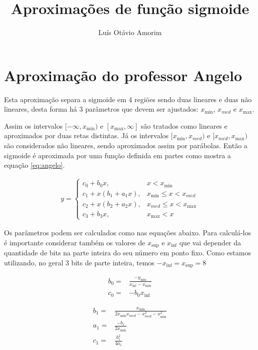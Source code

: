 \documentclass{article}
\author{Luís Otávio Amorim}
\title{Aproximações de função sigmoide}
\begin{document}
\maketitle
\section{Aproximação do professor Angelo}
Esta aproximação separa a sigmoide em 4 regiões sendo duas lineares e duas não lineares, desta forma há 3 parâmetros que devem ser ajustados: $x_{\min}$, $x_{med}$ e $x_{\max}$.

Assim os intervalos $[-\infty, x_{\min})$ e $[x_{\max}, \infty]$ são tratados como lineares e aproximados por duas retas distintas. Já os intervalos $[x_{\min}, x_{med})$ e $[x_{med}, x_{\max})$ são considerados não lineares, sendo aproximados assim por parábolas. Então a sigmoide é aproximada por uma função definida em partes como mostra a equação \ref{eq:angelo}.

\begin{equation}
    \label{eq:angelo}
    \begin{split}
    y =
    \begin{cases}
        c_0 + b_0  x, &x < x_{\min} \\
        c_1 + x  (b_1 + a_1  x), &x_{\min} \leq x < x_{med} \\
        c_2 + x  (b_2 + a_2  x), &x_{med} \leq x < x_{\max} \\
        c_3 + b_3  x,  &x_{\max} < x 
    \end{cases}
\end{split}
\end{equation}

Os parâmetros podem ser calculados como nas equações abaixo. Para calculá-los é importante considerar também os valores de $x_{\sup}$ e $x_{\inf}$ que vai depender da quantidade de bits na parte inteira do seu número em ponto fixo. Como estamos utilizando, no geral 3 bits de parte inteira, temos $-x_{\inf} = x_{\sup} = 8$ 

\begin{equation}
\begin{split}
    b_0 =& \frac{-y_{\min}}{x_{\inf} - x_{\min}} \\ 
    c_0 =& -b_0x_{\inf}
\end{split}
\end{equation}

\begin{equation}
\begin{split}
    b_1 =& \frac{x_{\min}}{2x_{\min}x_{med} - x_{med}^2 - x_{\min}^2} \\
    a_1 =& \frac{-b_1}{2x_{\min}} \\
    c_1 =& \frac{b_1^2}{4a_1}
\end{split}
\end{equation}
\end{document}
